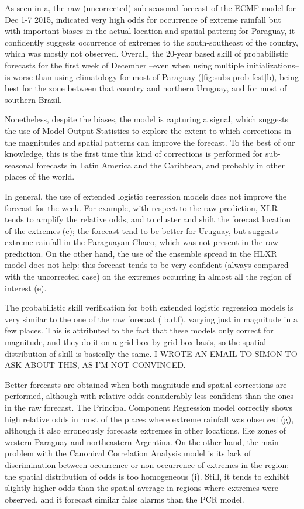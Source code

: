 \documentclass[twocol]{ametsoc}
\begin{document}
As seen in a, the raw (uncorrected) sub-seasonal forecast of the ECMF model for Dec 1-7 2015, indicated very high odds for occurrence of extreme rainfall but with important biases in the actual location and spatial pattern; for Paraguay, it confidently suggests occurrence of extremes to the south-southeast of the country, which was mostly not observed. Overall, the 20-year based skill of probabilistic forecasts for the first week of December --even when using multiple initializations-- is worse than using climatology for most of Paraguay (\cref{fig:subs-prob-fcst}b), being best for the zone between that country and northern Uruguay, and for most of southern Brazil.

Nonetheless, despite the biases, the model is capturing a signal, which suggests the use of Model Output Statistics to explore the extent to which corrections in the magnitudes and spatial patterns can improve the forecast. To the best of our knowledge, this is the first time this kind of corrections is performed for sub-seasonal forecasts in Latin America and the Caribbean, and probably in other places of the world.

In general, the use of extended logistic regression models does not improve the forecast for the week. For example, with respect to the raw prediction, XLR tends to amplify the relative odds, and to cluster and shift the forecast location of the extremes (c); the forecast tend to be better for Uruguay, but suggests extreme rainfall in the Paraguayan Chaco, which was not present in the raw prediction. On the other hand, the use of the ensemble spread in the HLXR model does not help: this forecast tends to be very confident (always compared with the uncorrected case) on the extremes occurring in almost all the region of interest (e).

The probabilistic skill verification for both extended logistic regression models is very similar to the one of the raw forecast ( b,d,f), varying just in magnitude in a few places. This is attributed to the fact that these models only correct for magnitude, and they do it on a grid-box by grid-box basis, so the spatial distribution of skill is basically the same. I WROTE AN EMAIL TO SIMON TO ASK ABOUT THIS, AS I'M NOT CONVINCED.

Better forecasts are obtained when both magnitude and spatial corrections are performed, although with relative odds considerably less confident than the ones in the raw forecast. The Principal Component Regression model correctly shows high relative odds in most of the places where extreme rainfall was observed (g), although it also erroneously forecasts extremes in other locations, like zones of western Paraguay and northeastern Argentina. On the other hand, the main problem with the Canonical Correlation Analysis model is its lack of discrimination between occurrence or non-occurrence of extremes in the region: the spatial distribution of odds is too homogeneous (i). Still, it tends to exhibit slightly higher odds than the spatial average in regions where extremes were observed, and it forecast similar false alarms than the PCR model.
\end{document}
